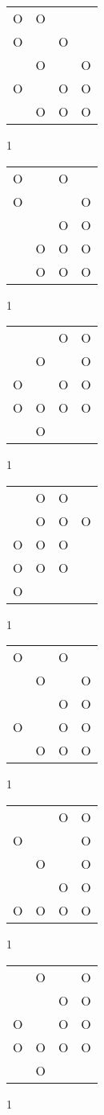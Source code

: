 \begin{tabular}{|m{0.2cm}m{0.2cm}m{0.2cm}m{0.2cm}|}\hline
O&O& & \\
O& &O& \\
 &O& &O\\
O& &O&O\\
 &O&O&O\\
\hline\end{tabular}1
\begin{tabular}{|m{0.2cm}m{0.2cm}m{0.2cm}m{0.2cm}|}\hline
O& &O& \\
O& & &O\\
 & &O&O\\
 &O&O&O\\
 &O&O&O\\
\hline\end{tabular}1
\begin{tabular}{|m{0.2cm}m{0.2cm}m{0.2cm}m{0.2cm}|}\hline
 & &O&O\\
 &O& &O\\
O& &O&O\\
O&O&O&O\\
 &O& & \\
\hline\end{tabular}1
\begin{tabular}{|m{0.2cm}m{0.2cm}m{0.2cm}m{0.2cm}|}\hline
 &O&O& \\
 &O&O&O\\
O&O&O& \\
O&O&O& \\
O& & & \\
\hline\end{tabular}1
\begin{tabular}{|m{0.2cm}m{0.2cm}m{0.2cm}m{0.2cm}|}\hline
O& &O& \\
 &O& &O\\
 & &O&O\\
O& &O&O\\
 &O&O&O\\
\hline\end{tabular}1
\begin{tabular}{|m{0.2cm}m{0.2cm}m{0.2cm}m{0.2cm}|}\hline
 & &O&O\\
O& & &O\\
 &O& &O\\
 & &O&O\\
O&O&O&O\\
\hline\end{tabular}1
\begin{tabular}{|m{0.2cm}m{0.2cm}m{0.2cm}m{0.2cm}|}\hline
 &O& &O\\
 & &O&O\\
O& &O&O\\
O&O&O&O\\
 &O& & \\
\hline\end{tabular}1
